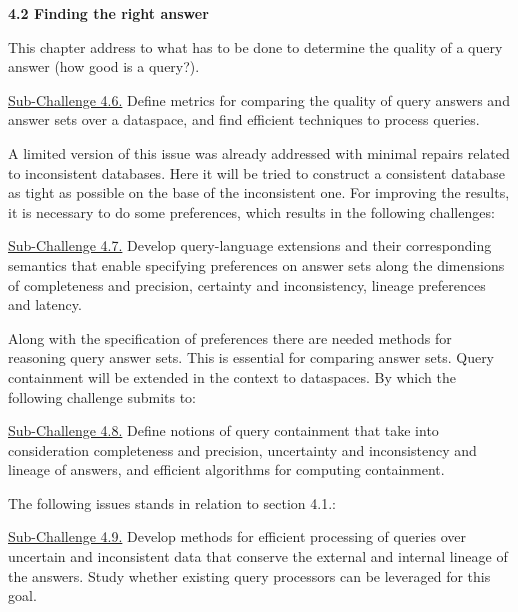 \textbf{4.2 Finding the right answer}

This chapter address to what has to be done to determine the quality of a query answer (how good is a query?).

\uline{Sub-Challenge 4.6.} Define metrics for comparing the quality of query answers and answer sets over a dataspace, and find efficient techniques to process queries.

A limited version of this issue was already addressed with minimal repairs related to inconsistent databases. Here it will be tried to construct a consistent database as tight as possible on the base of the inconsistent one. For improving the results, it is necessary to do some preferences, which results in the following challenges:

\uline{Sub-Challenge 4.7.} Develop query-language extensions and their corresponding semantics that enable specifying preferences on answer sets along the dimensions of completeness and precision, certainty and inconsistency, lineage preferences and latency.

Along with the specification of preferences there are needed methods for reasoning query answer sets. This is essential for comparing answer sets. Query containment \cite{Chandra:1977:OIC:800105.803397} will be extended in the context to dataspaces. By which the following challenge submits to:

\uline{Sub-Challenge 4.8.} Define notions of query containment that take into consideration completeness and precision, uncertainty and inconsistency and lineage of answers, and efficient algorithms for computing containment.

The following issues stands in relation to section 4.1.:

\uline{Sub-Challenge 4.9.} Develop methods for efficient processing of queries over uncertain and inconsistent data that conserve the external and internal lineage of the answers. Study whether existing query processors can be leveraged for this goal.